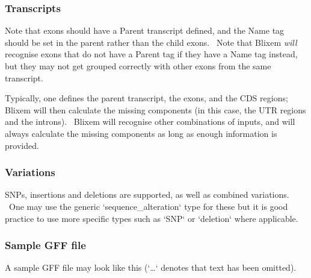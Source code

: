 \documentclass[letterpaper]{article}
\begin{document}
{\color[rgb]{0.30980393,0.5058824,0.7411765}\subsubsection[Transcripts]{Transcripts}}

{Note that exons should have a Parent transcript defined, and the Name
tag should be set in the parent rather than the child exons. \ Note
that Blixem \textit{will} recognise exons that do not have a Parent tag
if they have a Name tag instead, but they may not get grouped correctly
with other exons from the same transcript.}

\bigskip

{Typically, one defines the parent transcript, the exons, and the CDS
regions; Blixem will then calculate the missing components (in this
case, the UTR regions and the introns). \ Blixem will recognise other
combinations of inputs, and will always calculate the missing
components as long as enough information is provided. }

\bigskip

{\color[rgb]{0.30980393,0.5058824,0.7411765}\subsubsection[Variations]{Variations}}

{SNPs, insertions and deletions are supported, as well as combined
variations. \ One may use the generic
{\textquoteleft}sequence\_alteration{\textquoteleft} type for these but
it is good practice to use more specific types such as
{\textquoteleft}SNP{\textquoteleft} or
{\textquoteleft}deletion{\textquoteleft} where applicable.}

\bigskip

{\color[rgb]{0.30980393,0.5058824,0.7411765}\subsubsection[Sample GFF file]{Sample GFF file}}

{A sample GFF file may look like this
({\textquoteleft}{\dots}{\textquoteleft} denotes that text has been
omitted).}

\bigskip
\end{document}
